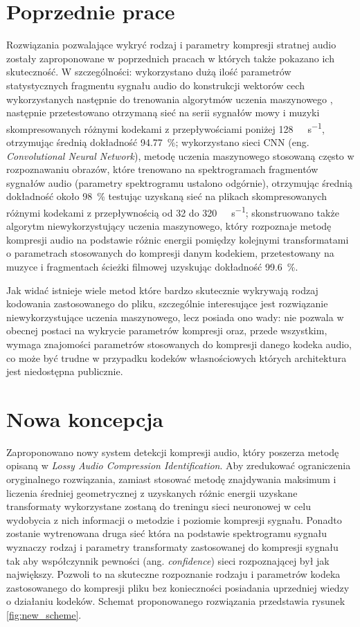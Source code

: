 \documentclass[12pt]{oska}
\let\Oldsection\section
\renewcommand{\section}{\FloatBarrier\Oldsection}
\begin{document}
\section{Poprzednie prace}
Rozwiązania pozwalające wykryć rodzaj i parametry kompresji stratnej audio
zostały zaproponowane w poprzednich pracach w których także pokazano
ich skuteczność. W szczególności: wykorzystano dużą ilość parametrów
statystycznych fragmentu sygnału audio do konstrukcji wektorów cech
wykorzystanych następnie do trenowania algorytmów uczenia maszynowego%
\cite{Hicsonmez2011AudioCI}, następnie przetestowano otrzymaną sieć na serii
sygnałów mowy i muzyki skompresowanych różnymi kodekami z przepływościami poniżej
\SI{128}{\kilo\bit\per\second}, otrzymując średnią dokładność
\SI{94.77}{\percent}\cite{Hicsonmez2013MethodsIT}; wykorzystano sieci CNN (eng.
\textit{Convolutional Neural Network}), metodę uczenia maszynowego stosowaną
często w rozpoznawaniu obrazów, które trenowano na spektrogramach fragmentów
sygnałów audio (parametry spektrogramu ustalono odgórnie), otrzymując średnią
dokładność około \SI{98}{\percent} testując uzyskaną sieć na plikach
skompresowanych różnymi kodekami z przepływnością od \num{32} do
\SI{320}{\kilo\bit\per\second}\cite{Hennequin2017CodecIL}; skonstruowano także
algorytm niewykorzystujący uczenia maszynowego, który rozpoznaje metodę
kompresji audio na podstawie różnic energii pomiędzy kolejnymi transformatami o
parametrach stosowanych do kompresji danym kodekiem, przetestowany na muzyce i
fragmentach ścieżki filmowej uzyskując dokładność
\SI{99.6}{\percent}\cite{Kim2018LossyAC}.

Jak widać istnieje wiele metod które bardzo skutecznie wykrywają rodzaj
kodowania zastosowanego do pliku, szczególnie interesujące jest rozwiązanie
niewykorzystujące uczenia maszynowego, lecz posiada ono wady: nie pozwala w
obecnej postaci na wykrycie parametrów kompresji oraz, przede wszystkim, wymaga
znajomości parametrów stosowanych do kompresji danego kodeka audio, co może być
trudne w przypadku kodeków własnościowych których architektura jest niedostępna
publicznie.
\section{Nowa koncepcja}
Zaproponowano nowy system detekcji kompresji audio, który poszerza metodę
opisaną w \textit{Lossy Audio Compression Identification}\cite{Kim2018LossyAC}. Aby zredukować ograniczenia oryginalnego
rozwiązania, zamiast stosować metodę znajdywania maksimum i liczenia średniej
geometrycznej z uzyskanych różnic energii uzyskane transformaty wykorzystane
zostaną do treningu sieci neuronowej w celu wydobycia z nich informacji o
metodzie i poziomie kompresji sygnału. Ponadto zostanie wytrenowana druga sieć
która na podstawie spektrogramu sygnału wyznaczy rodzaj i parametry
transformaty zastosowanej do kompresji sygnału tak aby współczynnik pewności
(ang. \textit{confidence}) sieci rozpoznającej był jak największy. Pozwoli to
na skuteczne rozpoznanie rodzaju i parametrów kodeka zastosowanego do kompresji
pliku bez konieczności posiadania uprzedniej wiedzy o działaniu kodeków.
Schemat proponowanego rozwiązania przedstawia rysunek \ref{fig:new_scheme}.
\end{document}
